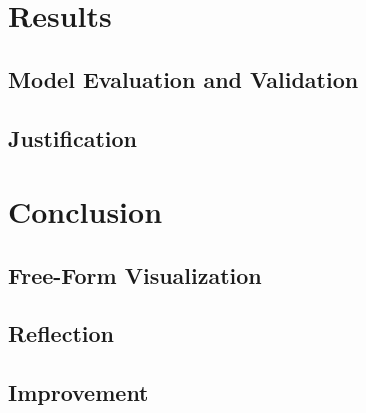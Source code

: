 \documentclass[11pt, a4paper, onecolumn]{article}
\begin{document}
\section{Results}
\subsection{Model Evaluation and Validation}
\subsection{Justification}
\section{Conclusion}
\subsection{Free-Form Visualization}
\subsection{Reflection}
\subsection{Improvement}


{}
\end{document}
